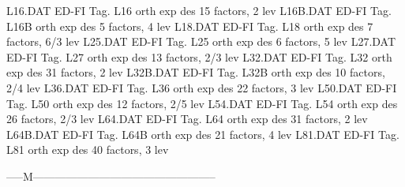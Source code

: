 L16.DAT                     ED-FI Tag. L16  orth exp des 15 factors,   2 lev
L16B.DAT                    ED-FI Tag. L16B orth exp des  5 factors,   4 lev
L18.DAT                     ED-FI Tag. L18  orth exp des  7 factors, 6/3 lev
L25.DAT                     ED-FI Tag. L25  orth exp des  6 factors,   5 lev
L27.DAT                     ED-FI Tag. L27  orth exp des 13 factors, 2/3 lev
L32.DAT                     ED-FI Tag. L32  orth exp des 31 factors,   2 lev
L32B.DAT                    ED-FI Tag. L32B orth exp des 10 factors, 2/4 lev
L36.DAT                     ED-FI Tag. L36  orth exp des 22 factors,   3 lev
L50.DAT                     ED-FI Tag. L50  orth exp des 12 factors, 2/5 lev
L54.DAT                     ED-FI Tag. L54  orth exp des 26 factors, 2/3 lev
L64.DAT                     ED-FI Tag. L64  orth exp des 31 factors,   2 lev
L64B.DAT                    ED-FI Tag. L64B orth exp des 21 factors,   4 lev
L81.DAT                     ED-FI Tag. L81  orth exp des 40 factors,   3 lev

-----M--------------------------------------------------


